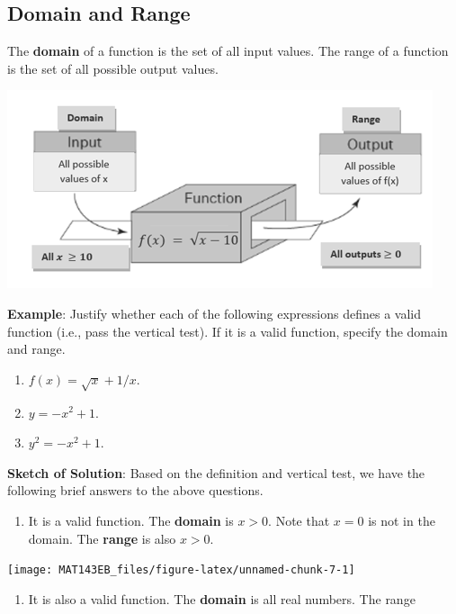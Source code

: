 \documentclass[
]{book}
\providecommand{\tightlist}{%
  \setlength{\itemsep}{0pt}\setlength{\parskip}{0pt}}
\begin{document}
\hypertarget{domain-and-range}{%
\subsection{Domain and Range}\label{domain-and-range}}

The \textbf{domain} of a function is the set of all input values. The range of a function is the set of all possible output values.

\begin{center}\includegraphics[width=0.55\linewidth]{img01/w01note03-DomainRangeFun} \end{center}

\textbf{Example}: Justify whether each of the following expressions defines a valid function (i.e., pass the vertical test). If it is a valid function, specify the domain and range.

\begin{enumerate}
\def\labelenumi{\arabic{enumi}.}
\item
  \(f(x) = \sqrt{x} + 1/x\).
\item
  \(y = -x^2 + 1\).
\item
  \(y^2 = -x^2 + 1\).
\end{enumerate}

\textbf{Sketch of Solution}: Based on the definition and vertical test, we have the following brief answers to the above questions.

\begin{enumerate}
\def\labelenumi{\arabic{enumi}.}
\tightlist
\item
  It is a valid function. The \textbf{domain} is \(x > 0\). Note that \(x = 0\) is not in the domain. The \textbf{range} is also \(x>0\).
\end{enumerate}

\begin{center}\texttt{[image: MAT143EB\_files/figure-latex/unnamed-chunk-7-1]} \end{center}

\begin{enumerate}
\def\labelenumi{\arabic{enumi}.}
\setcounter{enumi}{1}
\tightlist
\item
  It is also a valid function. The \textbf{domain} is all real numbers. The range
\end{enumerate}
\end{document}
